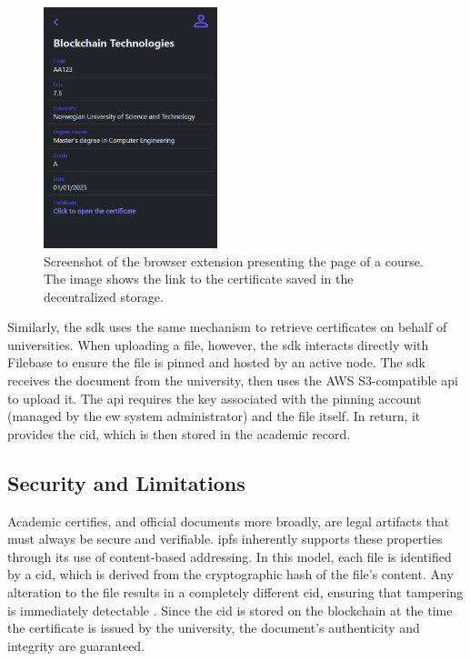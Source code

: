 \begin{figure}
  \centering
  \includegraphics[width=0.45\textwidth]{figures/SingleCourseWithCertificate.png}
  \caption[Browser extension screenshot with certificate link]{Screenshot of the browser extension presenting the page of a course. The image shows the link to the certificate saved in the decentralized storage.}
  \label{fig:courseWithCertificate}
\end{figure}

Similarly, the \acrshort{sdk} uses the same mechanism to retrieve certificates on behalf of universities. When uploading a file, however, the \acrshort{sdk} interacts directly with Filebase to ensure the file is pinned and hosted by an active node. The \acrshort{sdk} receives the document from the university, then uses the AWS S3-compatible \acrshort{api} to upload it. The \acrshort{api} requires the key associated with the pinning account (managed by the \acrshort{ew} system administrator) and the file itself. In return, it provides the \acrshort{cid}, which is then stored in the academic record.

\subsection{Security and Limitations}
Academic certifies, and official documents more broadly, are legal artifacts that must always be secure and verifiable. \acrshort{ipfs} inherently supports these properties through its use of content-based addressing. In this model, each file is identified by a \acrshort{cid}, which is derived from the cryptographic hash of the file's content. Any alteration to the file results in a completely different \acrshort{cid}, ensuring that tampering is immediately detectable \cite{benet2014ipfscontentaddressed}. Since the \acrshort{cid} is stored on the blockchain at the time the certificate is issued by the university, the document's authenticity and integrity are guaranteed.

